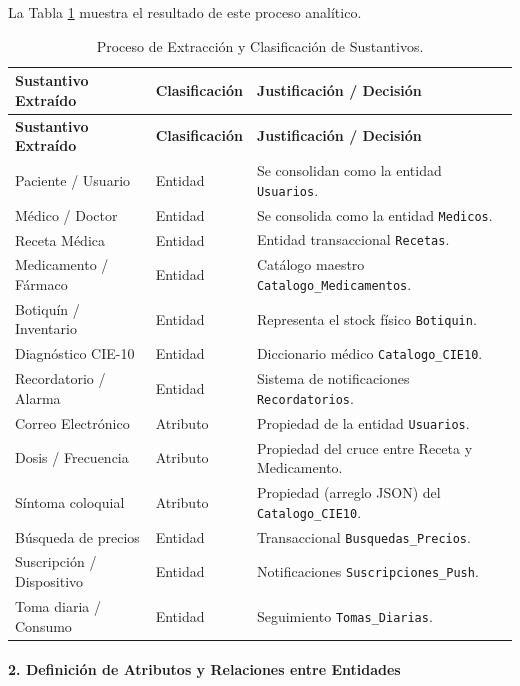 La Tabla \ref{tab:extraccion_sustantivos} muestra el resultado de este proceso analítico.

\begin{longtable}{|p{}|p{}|p{}|}
\caption{Proceso de Extracción y Clasificación de Sustantivos.}
\label{tab:extraccion_sustantivos} \\
\hline
\textbf{Sustantivo Extraído} & \textbf{Clasificación} & \textbf{Justificación / Decisión} \\
\hline
\endfirsthead
\hline
\textbf{Sustantivo Extraído} & \textbf{Clasificación} & \textbf{Justificación / Decisión} \\
\hline
\endhead
\hline
\endfoot
\hline
\endlastfoot
Paciente / Usuario & Entidad & Se consolidan como la entidad \texttt{Usuarios}. \\
\hline
Médico / Doctor & Entidad & Se consolida como la entidad \texttt{Medicos}. \\
\hline
Receta Médica & Entidad & Entidad transaccional \texttt{Recetas}. \\
\hline
Medicamento / Fármaco & Entidad & Catálogo maestro \texttt{Catalogo\_Medicamentos}. \\
\hline
Botiquín / Inventario & Entidad & Representa el stock físico \texttt{Botiquin}. \\
\hline
Diagnóstico CIE-10 & Entidad & Diccionario médico \texttt{Catalogo\_CIE10}. \\
\hline
Recordatorio / Alarma & Entidad & Sistema de notificaciones \texttt{Recordatorios}. \\
\hline
Correo Electrónico & Atributo & Propiedad de la entidad \texttt{Usuarios}. \\
\hline
Dosis / Frecuencia & Atributo & Propiedad del cruce entre Receta y Medicamento. \\
\hline
Síntoma coloquial & Atributo & Propiedad (arreglo JSON) del \texttt{Catalogo\_CIE10}. \\
\hline
Búsqueda de precios & Entidad & Transaccional \texttt{Busquedas\_Precios}. \\
\hline
Suscripción / Dispositivo & Entidad & Notificaciones \texttt{Suscripciones\_Push}. \\
\hline
Toma diaria / Consumo & Entidad & Seguimiento \texttt{Tomas\_Diarias}. \\
\hline
\end{longtable}

\paragraph{2. Definición de Atributos y Relaciones entre Entidades} \leavevmode \\

